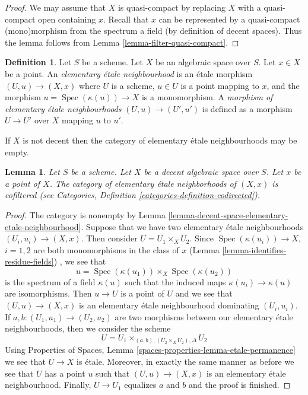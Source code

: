 \documentclass{stacks-project}
\theoremstyle{plain}
\newtheorem{lemma}[subsection]{Lemma}
\theoremstyle{definition}
\newtheorem{definition}[subsection]{Definition}
\theoremstyle{remark}
\numberwithin{equation}{subsection}
\def\Spec{\mathop{\mathrm{Spec}}}
\begin{document}
\begin{proof}
We may assume that $X$ is quasi-compact by replacing $X$ with a
quasi-compact open containing $x$. Recall that $x$ can be
represented by a quasi-compact (mono)morphism
from the spectrum a field (by definition of decent spaces). Thus the
lemma follows from Lemma \ref{lemma-filter-quasi-compact}.
\end{proof}

\begin{definition}
\label{definition-elemenary-etale-neighbourhood}
Let $S$ be a scheme. Let $X$ be an algebraic space over $S$.
Let $x \in X$ be a point. An {\it elementary \'etale neighbourhood}
is an \'etale morphism $(U, u) \to (X, x)$ where $U$ is a scheme,
$u \in U$ is a point mapping to $x$, and the morphism
$u = \Spec(\kappa(u)) \to X$ is a monomorphism.
A {\it morphism of elementary \'etale neighbourhoods}
$(U, u) \to (U', u')$ is defined as a morphism $U \to U'$
over $X$ mapping $u$ to $u'$.
\end{definition}

\noindent
If $X$ is not decent then the category of elementary \'etale neighbourhoods
may be empty.

\begin{lemma}
\label{lemma-elementary-etale-neighbourhoods}
Let $S$ be a scheme. Let $X$ be a decent algebraic space over $S$.
Let $x$ be a point of $X$.
The category of elementary \'etale neighborhoods of $(X, x)$
is cofiltered (see
Categories, Definition \ref{categories-definition-codirected}).
\end{lemma}

\begin{proof}
The category is nonempty by
Lemma \ref{lemma-decent-space-elementary-etale-neighbourhood}.
Suppose that we have two elementary \'etale neighbourhoods
$(U_i, u_i) \to (X, x)$.
Then consider $U = U_1 \times_X U_2$. Since
$\Spec(\kappa(u_i)) \to X$, $i = 1, 2$ are both monomorphisms
in the class of $x$ (Lemma \ref{lemma-identifies-residue-fields})
, we see that
$$
u = \Spec(\kappa(u_1)) \times_X \Spec(\kappa(u_2))
$$
is the spectrum of a field $\kappa(u)$ such that the induced maps
$\kappa(u_i) \to \kappa(u)$ are isomorphisms. Then $u \to U$ is a point
of $U$ and we see that $(U, u) \to (X, x)$ is an elementary
\'etale neighbourhood dominating $(U_i, u_i)$.
If $a, b : (U_1, u_1) \to (U_2, u_2)$ are two morphisms between
our elementary \'etale neighbourhoods, then we consider the scheme
$$
U = U_1 \times_{(a, b), (U_2 \times_X U_2), \Delta} U_2
$$
Using Properties of Spaces, Lemma
\ref{spaces-properties-lemma-etale-permanence}
we see that $U \to X$ is \'etale. Moreover, in exactly the same manner
as before we see that $U$ has a point $u$
such that $(U, u) \to (X, x)$ is an elementary
\'etale neighbourhood. Finally, $U \to U_1$ equalizes $a$ and $b$
and the proof is finished.
\end{proof}
\end{document}
